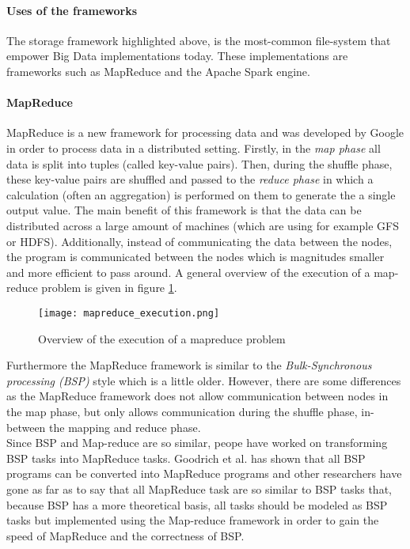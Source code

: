 \paragraph{Uses of the frameworks}
The storage framework highlighted above, is the most-common file-system that empower Big Data implementations today. These implementations are frameworks such as MapReduce and the Apache Spark engine.

\paragraph{MapReduce}
MapReduce is a new framework for processing data and was developed by Google\cite{Dean04} in order to process data in a distributed setting. Firstly, in the \textit{map phase} all data is split into tuples (called key-value pairs). Then, during the shuffle phase, these key-value pairs are shuffled and passed to the \textit{reduce phase} in which a calculation (often an aggregation) is performed on them to generate the a single output value. The main benefit of this framework is that the data can be distributed across a large amount of machines (which are using for example GFS or HDFS). Additionally, instead of communicating the data between the nodes, the program is communicated between the nodes which is magnitudes smaller and more efficient to pass around. A general overview of the execution of a map-reduce problem is given in figure \ref{mapreduce_execution}.

\begin{figure}
  \texttt{[image: mapreduce\_execution.png]}
  \caption{Overview of the execution of a mapreduce problem\cite{Dean04}}
  \label{mapreduce_execution}
\end{figure}

Furthermore the MapReduce framework is similar to the \textit{Bulk-Synchronous processing (BSP)} style which is a little older. However, there are some differences as the MapReduce framework does not allow communication between nodes in the map phase, but only allows communication during the shuffle phase, in-between the mapping and reduce phase\cite{Pace12}.\\
Since BSP and Map-reduce are so similar, peope have worked on transforming BSP tasks into MapReduce tasks. Goodrich et al.\cite{Goo11} has shown that all BSP programs can be converted into MapReduce programs and other researchers have gone as far as to say that all MapReduce task are so similar to BSP tasks that, because BSP has a more theoretical basis, all tasks should be modeled as BSP tasks but implemented using the Map-reduce framework in order to gain the speed of MapReduce and the correctness of BSP\cite{Pace12}.

